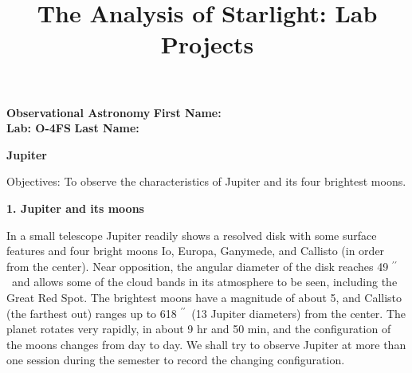 \documentclass[12pt]{article}
\title{The Analysis of Starlight: Lab Projects}
\begin{document}
\setcounter{page}{1}
\setcounter{equation}{0}
\pagestyle{plain}
\thispagestyle{empty}  %
\newcommand{\kms}{\hbox{km\,s$^{\rm -1}$}}
\def\lo {\ifmmode {\,{\it L}\solar} \else $\,L$\solar\fi}       %
\def\my {\ifmmode {\,{\it M}\solar\,{\rm yr^{-1}}}              %
        \else {$\,M$\solar$\,$yr$^{\rm -1}$}\fi}
\def\BD {BD$\,$+30{\degr}3639}
\def\HUNO{\rm H$\,$I}                   %
\def\HDOS{\rm H$_2$}                    %
\def\arcsec{\ifmmode {^{\scriptscriptstyle\prime\prime}}
          \else $^{\scriptscriptstyle\prime\prime}$\fi}
\def\arcmin{\ifmmode {^{\scriptscriptstyle\prime}}
          \else $^{\scriptscriptstyle\prime}$\fi}
\def\deg{\ifmmode^\circ\else$^\circ$\fi}

\sloppy





\noindent
{\bf Observational Astronomy    \hfill} {\bf First Name: \makebox[4cm]{\hrulefill}}\\
{\bf Lab: O-4FS} \hfill {\bf Last Name: \makebox[4cm]{\hrulefill}}


\bigskip

\medskip

\noindent
{\hfill \Large {\bf Jupiter} \hfill}


\bigskip

\noindent
{Objectives:} To observe the characteristics of Jupiter and its four
brightest moons.

\bigskip\noindent

\bigskip
\noindent
{\bf 1. Jupiter and its moons}

\medskip
\noindent
In a small telescope Jupiter readily shows a resolved disk with some
surface features and four bright moons Io, Europa, Ganymede, and
Callisto (in order from the center).  Near opposition, the angular
diameter of the disk reaches 49\arcsec\ and allows some of the cloud
bands in its atmosphere to be seen, including the Great Red Spot.  The
brightest moons have a magnitude of about 5, and Callisto (the
farthest out) ranges up to 618\arcsec\ (13 Jupiter diameters) from the
center. The planet rotates very rapidly, in about 9 hr and 50 min, and
the configuration of the moons changes from day to day. We shall try
to observe Jupiter at more than one session during the semester to
record the changing configuration.
\end{document}
